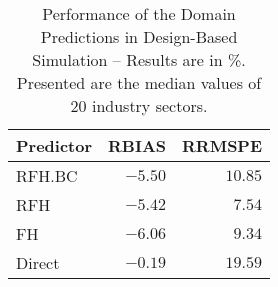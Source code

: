 \begin{table}[ht]
\begin{center}
\begin{tabular}{lrr}
\hline\hline
\multicolumn{1}{c}{Predictor}&\multicolumn{1}{c}{RBIAS}&\multicolumn{1}{c}{RRMSPE}\tabularnewline
\hline
RFH.BC&$-5.50$&$10.85$\tabularnewline
RFH&$-5.42$&$ 7.54$\tabularnewline
FH&$-6.06$&$ 9.34$\tabularnewline
Direct&$-0.19$&$19.59$\tabularnewline
\hline
\end{tabular}

\caption[Performance of the Domain Predictions in Design\hyp{}Based Simulation]{\label{tab:preds_performace_design}Performance of the Domain Predictions in Design\hyp{}Based Simulation -- Results are in \%. Presented are the median values of 20 industry sectors.\label{x}}\end{center}

\end{table}
